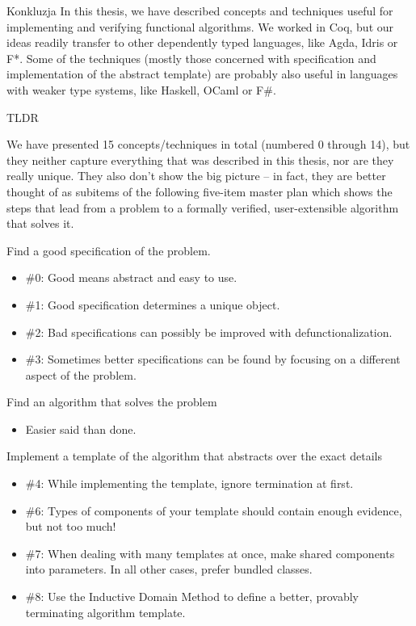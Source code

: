 \documentclass{beamer}
\begin{document}
\begin{frame}{Konkluzja}
	In this thesis, we have described concepts and techniques useful for implementing and verifying functional algorithms. We worked in Coq, but our ideas readily transfer to other dependently typed languages, like Agda, Idris or F*. Some of the techniques (mostly those concerned with specification and implementation of the abstract template) are probably also useful in languages with weaker type systems, like Haskell, OCaml or F\#.
\end{frame}

\begin{frame}{TLDR}
	
	We have presented 15 concepts/techniques in total (numbered 0 through 14), but they neither capture everything that was described in this thesis, nor are they really unique. They also don't show the big picture -- in fact, they are better thought of as subitems of the following five-item master plan which shows the steps that lead from a problem to a formally verified, user-extensible algorithm that solves it.
\end{frame}

\begin{frame}{Find a good specification of the problem.}
\begin{itemize}
	\item \#0: Good means abstract and easy to use.
	\item \#1: Good specification determines a unique object.
	\item \#2: Bad specifications can possibly be improved with defunctionalization.
	\item \#3: Sometimes better specifications can be found by focusing on a different aspect of the problem.
\end{itemize}
\end{frame}

\begin{frame}{Find an algorithm that solves the problem}
\begin{itemize}
	\item Easier said than done.
\end{itemize}
\end{frame}

\begin{frame}{Implement a template of the algorithm that abstracts over the exact details}
\begin{itemize}
	\item \#4: While implementing the template, ignore termination at first.
	\item \#6: Types of components of your template should contain enough evidence, but not too much!
	\item \#7: When dealing with many templates at once, make shared components into parameters. In all other cases, prefer bundled classes.
	\item \#8: Use the Inductive Domain Method to define a better, provably terminating algorithm template.
\end{itemize}
\end{frame}
\end{document}
